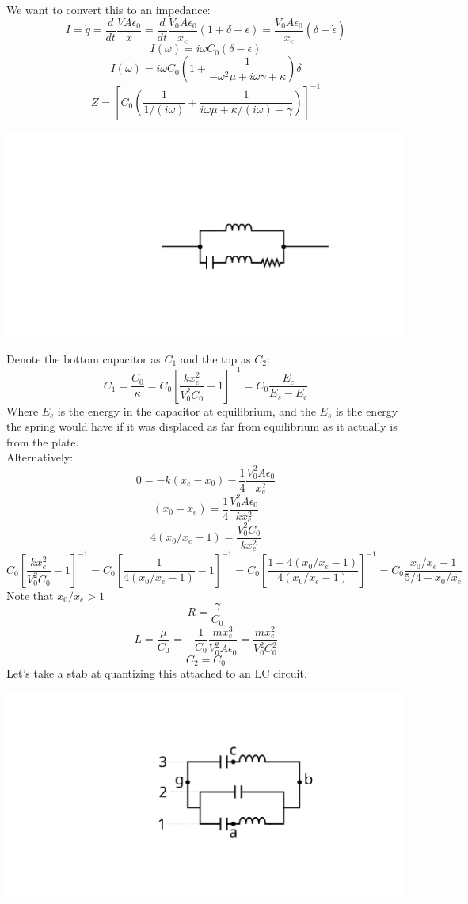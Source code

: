 \documentclass[final]{article}
\begin{document}
We want to convert this to an impedance:
\[I=\dot q=\frac{d}{dt}\frac{V A\epsilon_0}{x}=\frac{d}{dt}\frac{V_0 A\epsilon_0}{x_e} (1+\delta-\epsilon)=\frac{V_0 A\epsilon_0}{x_e} (\dot \delta-\dot \epsilon)\]
\[I(\omega)=i\omega C_0 (\delta-\epsilon)\]
\[I(\omega)=i\omega C_0 \left(1+\frac{1}{-\omega^2\mu+i\omega\gamma+\kappa}\right)\delta\]
\[Z=\left[C_0 \left(\frac{1}{1/(i\omega)}+\frac{1}{i\omega\mu+\kappa/(i\omega)+\gamma}\right)\right]^{-1}\]
{\centering \includegraphics{eq-circ} \par}
Denote the bottom capacitor as \(C_1\) and the top as \(C_2\):
\[C_1=\frac{C_0}{\kappa}=C_0\left[\frac{k x_e^2}{V_0^2 C_0}-1\right]^{-1}=C_0 \frac{E_c}{E_s-E_c}\]
Where \(E_c\) is the energy in the capacitor at equilibrium, and the \(E_s\) is the energy the spring would have if it was displaced as far from equilibrium as it actually is from the plate.\\
Alternatively:
\[0=-k(x_e-x_0)-\frac{1}{4}\frac{V_0^2A\epsilon_0}{x_e^2}\]
\[(x_0-x_e)=\frac{1}{4}\frac{V_0^2A\epsilon_0}{kx_e^2}\]
\[4(x_0/x_e-1)=\frac{V_0^2C_0}{kx_e^2}\]
\[C_0\left[\frac{k x_e^2}{V_0^2 C_0}-1\right]^{-1}=C_0\left[\frac{1}{4(x_0/x_e-1)}-1\right]^{-1}=
C_0\left[\frac{1-4(x_0/x_e-1)}{4(x_0/x_e-1)}\right]^{-1}=C_0\frac{x_0/x_e-1}{5/4-x_0/x_e}\]
Note that \(x_0/x_e>1\)
\[R=\frac{\gamma}{C_0}\]
\[L=\frac{\mu}{C_0}=-\frac{1}{C_0} \frac{mx_e^3}{V_0^2 A \epsilon_0}=\frac{mx_e^2}{V_0^2 C_0^2}\]
\[C_2=C_0\]
Let's take a stab at quantizing this attached to an LC circuit.\\
{\centering \includegraphics{eq-circ_2} \par}
\end{document}
